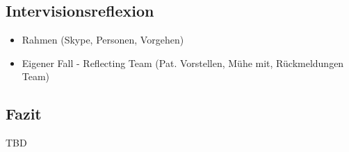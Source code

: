 \documentclass[jou,apacite]{apa6}
\begin{document}
\subsection{Intervisionsreflexion} \label{sec:Intervision}
\begin{itemize}
    \item Rahmen (Skype, Personen, Vorgehen)
    \item Eigener Fall - Reflecting Team (Pat. Vorstellen, Mühe mit, Rückmeldungen Team)
\end{itemize}

\subsection{Fazit}
TBD

\begin{flushleft}
\nocite{*}
{}
\end{flushleft}
\end{document}
